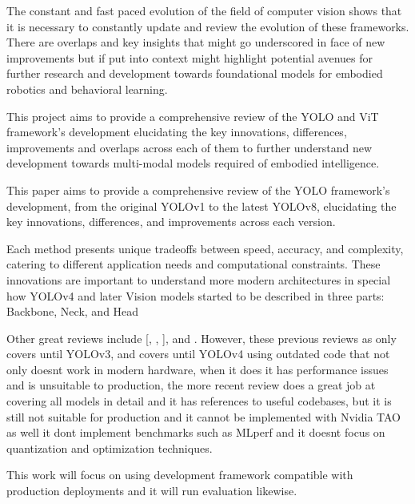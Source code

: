 \documentclass{article}
\begin{document}
The constant and fast paced evolution of the field of computer vision shows that it is necessary to constantly update and review the evolution of these frameworks. 
There are overlaps and key insights that might go underscored in face of new improvements but if put into context might highlight potential avenues for further research and development towards foundational models for embodied robotics and behavioral learning.

This project aims to provide a comprehensive review of the YOLO and ViT framework’s development elucidating the key innovations, differences, improvements and overlaps across each of them to further understand new development towards multi-modal models required of embodied intelligence.


This paper aims to provide a comprehensive review of the YOLO framework’s development, from the original YOLOv1 to the latest YOLOv8, elucidating the key innovations, differences, and improvements across each version.

Each method presents unique tradeoffs between speed, accuracy, and complexity, catering to different application needs and computational constraints. These innovations are important to understand more modern architectures in special how YOLOv4 and later Vision models started to be described in three parts: Backbone, Neck, and Head

Other great reviews include [\cite{bhavya2021inter}, \cite{diwan2023object}, \cite{hussain2023yolo}], and \cite{terven2023comprehensive}. However, these previous reviews as \cite{bhavya2021inter} only covers until YOLOv3, and \cite{diwan2023object} covers until YOLOv4 using outdated code that not only doesnt work in modern hardware, when it does it has performance issues and is unsuitable to production, the more recent review \cite{terven2023comprehensive} does a great job at covering all models in detail and it has references to useful codebases, but it is still not suitable for production and it cannot be implemented with Nvidia TAO as well it dont implement benchmarks such as MLperf and it doesnt focus on quantization and optimization techniques. 

This work will focus on using development framework compatible with production deployments and it will run evaluation likewise.


\end{document}
